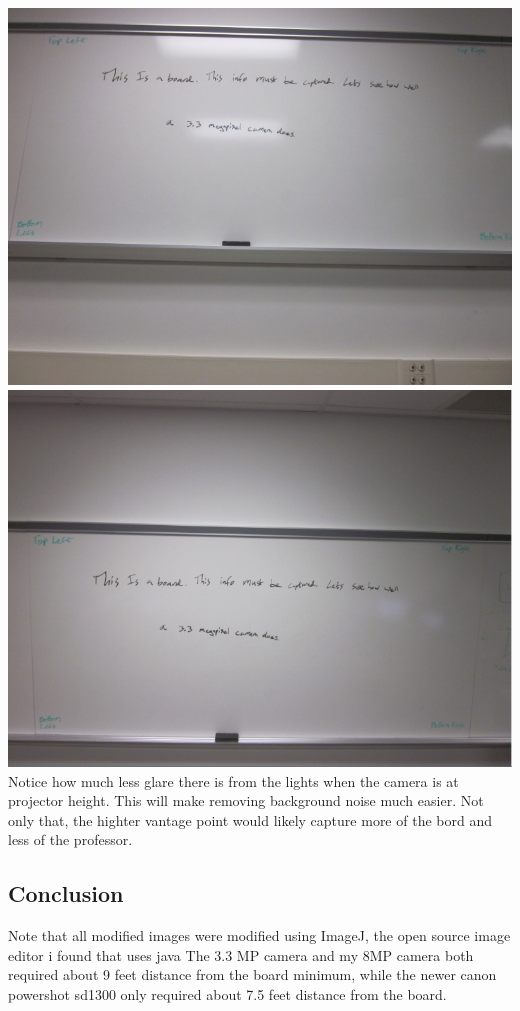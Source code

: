 \documentclass[]{article}
\begin{document}
		\includegraphics{images/TableLevelCanon.jpg} \\
		\includegraphics{images/ProjectorHeightCanon.jpg} \\
		Notice how much less glare there is from the lights when the camera is at projector height. This will make removing background noise much easier. Not only that, the highter vantage point would likely capture more of the bord and less of the professor.\\
		
		\subsection{Conclusion}
			Note that all modified images were modified using ImageJ, the open source image editor i found that uses java
			The 3.3 MP camera and my 8MP camera both required about 9 feet distance from the board minimum, while the newer canon powershot sd1300 only required about 7.5 feet distance from the board.\\
			
\end{document}
